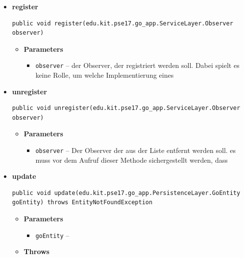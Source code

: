 \documentclass[11pt,a4paper]{article}
\begin{document}
{{{{{{{{{{{{\begin{itemize}
{\begin{itemize}
{}%
\end{itemize}
}%
\item{ 
\hypertarget{edu.kit.pse17.go_app.PersistenceLayer.daos.GoDaoImp.register(edu.kit.pse17.go_app.ServiceLayer.Observer)}{{\bf  register}\\}
\begin{lstlisting}[frame=none]
public void register(edu.kit.pse17.go_app.ServiceLayer.Observer observer)\end{lstlisting} %
\begin{itemize}
\item{
{\bf  Parameters}
  \begin{itemize}
   \item{
\texttt{observer} -- der Observer, der registriert werden soll. Dabei spielt es keine Rolle, um welche Implementierung eines}
  \end{itemize}
}%
\end{itemize}
}%
\item{ 
\hypertarget{edu.kit.pse17.go_app.PersistenceLayer.daos.GoDaoImp.unregister(edu.kit.pse17.go_app.ServiceLayer.Observer)}{{\bf  unregister}\\}
\begin{lstlisting}[frame=none]
public void unregister(edu.kit.pse17.go_app.ServiceLayer.Observer observer)\end{lstlisting} %
\begin{itemize}
\item{
{\bf  Parameters}
  \begin{itemize}
   \item{
\texttt{observer} -- Der Observer der aus der Liste entfernt werden soll. es muss vor dem Aufruf dieser Methode sichergestellt werden, dass}
  \end{itemize}
}%
\end{itemize}
}%
\item{ 
\hypertarget{edu.kit.pse17.go_app.PersistenceLayer.daos.GoDaoImp.update(edu.kit.pse17.go_app.PersistenceLayer.GoEntity)}{{\bf  update}\\}
\begin{lstlisting}[frame=none]
public void update(edu.kit.pse17.go_app.PersistenceLayer.GoEntity goEntity) throws EntityNotFoundException\end{lstlisting} %
\begin{itemize}
\item{
{\bf  Parameters}
  \begin{itemize}
   \item{
\texttt{goEntity} -- }
  \end{itemize}
}%
\item{{\bf  Throws}
}%
\end{itemize}
}%
\end{itemize}
}
}
}}}}}}}}}}
\end{document}
